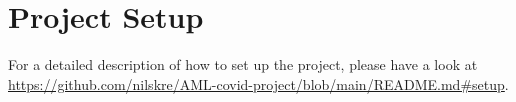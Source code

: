 \setcounter{section}{-1}
\section{Project Setup} \label{setup}

For a detailed description of how to set up the project, please have a look at \url{https://github.com/nilskre/AML-covid-project/blob/main/README.md#setup}.